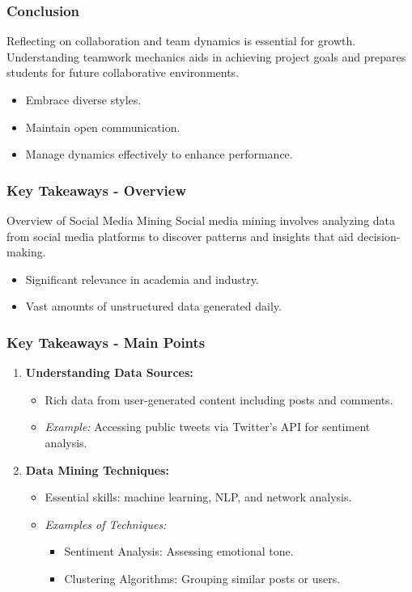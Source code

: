 \documentclass{beamer}
\begin{document}
\begin{frame}[fragile]
    \frametitle{Conclusion}
    Reflecting on collaboration and team dynamics is essential for growth. Understanding teamwork mechanics aids in achieving project goals and prepares students for future collaborative environments. 

    \begin{itemize}
        \item Embrace diverse styles.
        \item Maintain open communication.
        \item Manage dynamics effectively to enhance performance.
    \end{itemize}
\end{frame}

\begin{frame}[fragile]
    \frametitle{Key Takeaways - Overview}
    \begin{block}{Overview of Social Media Mining}
        Social media mining involves analyzing data from social media platforms to discover patterns and insights that aid decision-making.
    \end{block}
    
    \begin{itemize}
        \item Significant relevance in academia and industry.
        \item Vast amounts of unstructured data generated daily.
    \end{itemize}
\end{frame}

\begin{frame}[fragile]
    \frametitle{Key Takeaways - Main Points}
    \begin{enumerate}
        \item \textbf{Understanding Data Sources:}
            \begin{itemize}
                \item Rich data from user-generated content including posts and comments.
                \item \textit{Example:} Accessing public tweets via Twitter's API for sentiment analysis.
            \end{itemize}
            
        \item \textbf{Data Mining Techniques:}
            \begin{itemize}
                \item Essential skills: machine learning, NLP, and network analysis.
                \item \textit{Examples of Techniques:}
                \begin{itemize}
                    \item Sentiment Analysis: Assessing emotional tone.
                    \item Clustering Algorithms: Grouping similar posts or users.
                \end{itemize}
            \end{itemize}
    \end{enumerate}
\end{frame}
\end{document}
